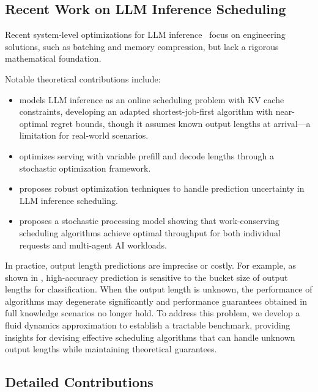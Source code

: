 \documentclass[preprint]{article}
\theoremstyle{plain}
\theoremstyle{definition}
\theoremstyle{remark}
\begin{document}
\subsection{Recent Work on LLM Inference Scheduling}

Recent system-level optimizations for LLM inference~\cite{yu2022orca, kwon2023efficient, agrawal2023sarathi, pope2023efficiently, deepseekai2024deepseekv2strongeconomicalefficient, patel2024splitwise, zhong2024distserve} focus on engineering solutions, such as batching and memory compression, but lack a rigorous mathematical foundation. 

Notable theoretical contributions include:
\begin{itemize}
\item \cite{jaillet2025onlineschedulingllminference} models LLM inference as an online scheduling problem with KV cache constraints, developing an adapted shortest-job-first algorithm with near-optimal regret bounds, though it assumes known output lengths at arrival—a limitation for real-world scenarios.
\item \cite{wang2025llm} optimizes serving with variable prefill and decode lengths through a stochastic optimization framework.
\item \cite{chen2025adaptively} proposes robust optimization techniques to handle prediction uncertainty in LLM inference scheduling.
\item \cite{li2025throughput} proposes a stochastic processing model showing that work-conserving scheduling algorithms achieve optimal throughput for both individual requests and multi-agent AI workloads.
\end{itemize}

In practice, output length predictions are imprecise or costly. For example, as shown in \cite{fu2025efficient}, high-accuracy prediction is sensitive to the bucket size of output lengths for classification. When the output length is unknown, the performance of algorithms may degenerate significantly and performance guarantees obtained in full knowledge scenarios no longer hold. To address this problem, we develop a fluid dynamics approximation to establish a tractable benchmark, providing insights for devising effective scheduling algorithms that can handle unknown output lengths while maintaining theoretical guarantees.

\subsection{Detailed Contributions}
\end{document}
